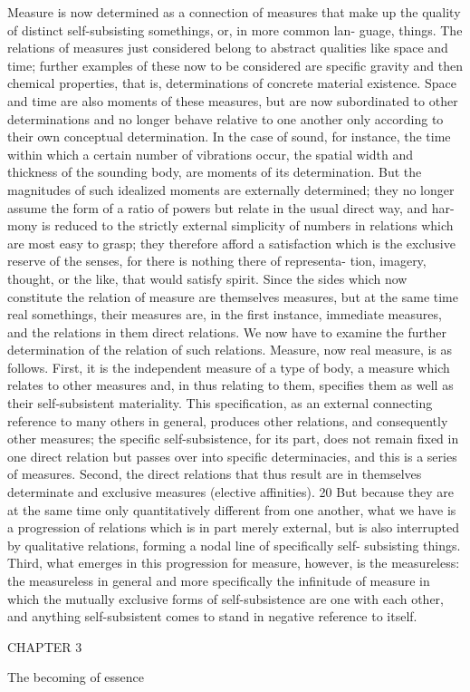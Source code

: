 Measure is now determined as a connection of measures that make up the
quality of distinct self-subsisting somethings, or, in more common lan-
guage, things. The relations of measures just considered belong to abstract
qualities like space and time; further examples of these now to be considered
are specific gravity and then chemical properties, that is, determinations
of concrete material existence. Space and time are also moments of these
measures, but are now subordinated to other determinations and no longer
behave relative to one another only according to their own conceptual
determination. In the case of sound, for instance, the time within which a
certain number of vibrations occur, the spatial width and thickness of the
sounding body, are moments of its determination. But the magnitudes of
such idealized moments are externally determined; they no longer assume
the form of a ratio of powers but relate in the usual direct way, and har-
mony is reduced to the strictly external simplicity of numbers in relations
which are most easy to grasp; they therefore afford a satisfaction which is
the exclusive reserve of the senses, for there is nothing there of representa-
tion, imagery, thought, or the like, that would satisfy spirit. Since the sides
which now constitute the relation of measure are themselves measures, but
at the same time real somethings, their measures are, in the first instance,
immediate measures, and the relations in them direct relations. We now
have to examine the further determination of the relation of such relations.
Measure, now real measure, is as follows.
First, it is the independent measure of a type of body, a measure which
relates to other measures and, in thus relating to them, specifies them as
well as their self-subsistent materiality. This specification, as an external
connecting reference to many others in general, produces other relations,
and consequently other measures; the specific self-subsistence, for its part,
does not remain fixed in one direct relation but passes over into specific
determinacies, and this is a series of measures.
Second, the direct relations that thus result are in themselves determinate
and exclusive measures (elective affinities). 20 But because they are at the
same time only quantitatively different from one another, what we have
is a progression of relations which is in part merely external, but is also
interrupted by qualitative relations, forming a nodal line of specifically self-
subsisting things.
Third, what emerges in this progression for measure, however, is the
measureless: the measureless in general and more specifically the infinitude
of measure in which the mutually exclusive forms of self-subsistence are one
with each other, and anything self-subsistent comes to stand in negative
reference to itself.

CHAPTER 3

The becoming of essence
